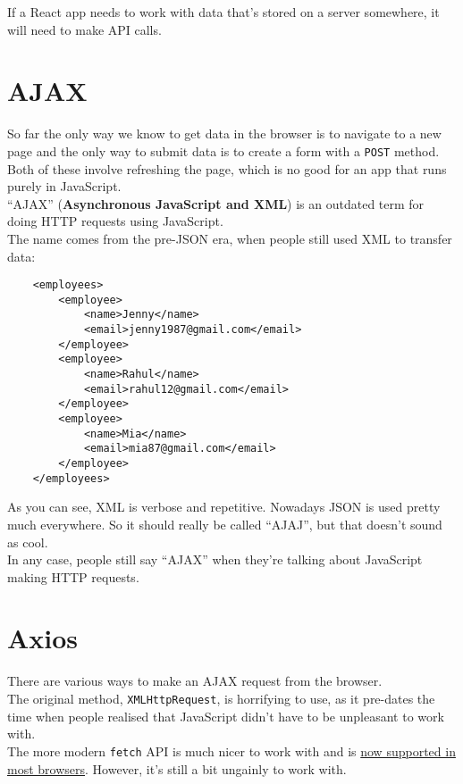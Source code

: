 If a React app needs to work with data that's stored on a server somewhere, it will need to make API calls.


\section{AJAX}

So far the only way we know to get data in the browser is to navigate to a new page and the only way to submit data is to create a form with a \texttt{POST} method. Both of these involve refreshing the page, which is no good for an app that runs purely in JavaScript.
\\


``AJAX'' (\textbf{Asynchronous JavaScript and XML}) is an outdated term for doing HTTP requests using JavaScript.
\\

The name comes from the pre-JSON era, when people still used XML to transfer data:

\begin{verbatim}
    <employees>
        <employee>
            <name>Jenny</name>
            <email>jenny1987@gmail.com</email>
        </employee>
        <employee>
            <name>Rahul</name>
            <email>rahul12@gmail.com</email>
        </employee>
        <employee>
            <name>Mia</name>
            <email>mia87@gmail.com</email>
        </employee>
    </employees>
\end{verbatim}

As you can see, XML is verbose and repetitive. Nowadays JSON is used pretty much everywhere. So it should really be called ``AJAJ'', but that doesn't sound as cool.
\\

In any case, people still say ``AJAX'' when they're talking about JavaScript making HTTP requests.


\section{Axios}

There are various ways to make an AJAX request from the browser.
\\

The original method, \texttt{XMLHttpRequest}, is horrifying to use, as it pre-dates the time when people realised that JavaScript didn't have to be unpleasant to work with.
\\

The more modern \texttt{fetch} API is much nicer to work with and is \href{https://caniuse.com/#feat=fetch}{now supported in most browsers}. However, it's still a bit ungainly to work with.
\\

